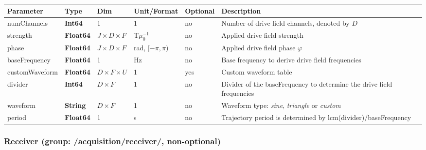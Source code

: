 \documentclass[landscape,a4paper]{article} %
\newcommand{\inltab}[1]{{\ttfamily\bfseries\color{blue}#1}}
\newcommand{\inlvar}[1]{{\ttfamily#1}}
\begin{document}
\noindent \begin{tabularx}{\columnwidth}{lllllX} 
\textbf{Parameter} & \textbf{Type} & \textbf{Dim} & \textbf{Unit/Format} & \textbf{Optional} & \textbf{Description} \\ \hline 
\inlvar{numChannels} & \inltab{Int64} & 1 & 1 & no & Number of drive field channels, denoted by $D$ \\ \hline
\inlvar{strength} & \inltab{Float64} & $J \times D \times F $ & T$\mu_0^{-1}$ & no & Applied drive field strength \\ \hline
\inlvar{phase} & \inltab{Float64} & $J \times D \times F$ & rad, $[-\pi,\pi)$ & no & Applied drive field phase $\varphi$\\ \hline
\inlvar{baseFrequency} & \inltab{Float64} & 1 & Hz & no & Base frequency to derive drive field frequencies \\ \hline
\inlvar{customWaveform} & \inltab{Float64} & $D \times F \times U$ & 1 & yes & Custom waveform table \\ \hline
\inlvar{divider} & \inltab{Int64} & $D \times F$ & 1 & no & Divider of the \inlvar{baseFrequency} to determine the drive field frequencies \\ \hline
\inlvar{waveform} & \inltab{String} & $D \times F$ & 1 & no & Waveform type: \textit{sine}, \textit{triangle} or \textit{custom} \\ \hline
\inlvar{period} & \inltab{Float64} & 1 & s & no & Trajectory period is determined by lcm(\inlvar{divider})/\inlvar{baseFrequency}\\ \hline
\end{tabularx}


\subsubsection{Receiver (group: \inlvar{/acquisition/receiver/}, non-optional)}
\end{document}

